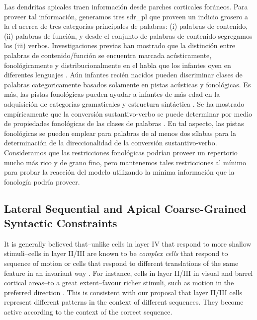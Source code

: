 {Las dendritas apicales traen información desde parches corticales foráneos.
Para proveer tal información, generamos tres \gls{sdr_pl} que proveen un indicio grosero a la \gls{el} acerca de tres categorías principales de palabras: (i) palabras de contenido, (ii) palabras de función, y desde el conjunto de palabras de contenido segregamos los (iii) verbos.
Investigaciones previas han mostrado que la distinción entre palabras de contenido/función se encuentra marcada acústicamente, fonológicamente y distribucionalmente en el habla que los infantes oyen en diferentes lenguajes \cite{Shi1995PerceptualCO,shi_morgan_allopenna_1998}.
Aún infantes recién nacidos pueden discriminar clases de palabras categoricamente basados solamente en pistas acústicas y fonológicas.
Es más, las pistas fonológicas pueden ayudar a infantes de más edad en la adquisición de categorías gramaticales y estructura sintáctica \cite{shi_newborn_1999}.
Se ha mostrado empíricamente que la conversión sustantivo-verbo se puede determinar por medio de propiedades fonológicas de las clases de palabras \cite{lohmann_phonological_2017}.
En tal aspecto, las pistas fonológicas se pueden emplear para palabras de al menos dos sílabas para la determinación de la direccionalidad de la conversión sustantivo-verbo.
Consideramos que las restricciones fonológicas podrían proveer un repertorio mucho más rico y de grano fino, pero mantenemos tales restricciones al mínimo para probar la reacción del modelo utilizando la mínima información que la fonología podría proveer.
}{
\subsection{Lateral Sequential and Apical Coarse-Grained Syntactic Constraints}

It is generally believed that--unlike cells in layer IV that respond to more shallow stimuli--cells in layer II/III are known to be \emph{complex cells} that respond to sequence of motion or cells that respond to different translations of the same feature in an invariant way \cite{10.1371/journal.pcbi.1000532}.
For instance, cells in layer II/III in visual and barrel cortical areas--to a great extent--favour richer stimuli, such as motion in the preferred direction \cite{HIRSCH2006377}. This is consistent with our proposal that layer II/III cells represent different  patterns in the context of different sequences. They become active according to the context of the correct sequence.

}
